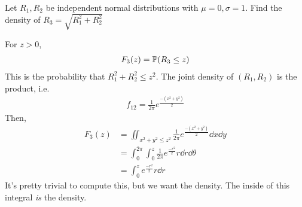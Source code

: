 \begin{example}
    Let $R_1,R_2$ be independent normal distributions with $\mu = 0, \sigma = 1$. Find the density of $R_3 = \sqrt{R_1^2 + R_2^2}$
\end{example}
\begin{solution}
    For $z > 0$,
    \begin{align}
        F_3(z) = \mathbb{P}(R_3 \le z)
    \end{align}
    This is the probability that $R_1^2 + R_2^2 \le z^2$. The joint density of $(R_1,R_2)$ is the product, i.e.
    \begin{align}
        f_{12} = \frac{1}{2\pi} e^{\frac{-(x^2+y^2)}{2}}
    \end{align}
    Then,
    \begin{align}
        F_3(z) &= \iint_{x^2+y^2 \le z^2} \frac{1}{2\pi} e^{\frac{-(x^2+y^2)}{2}} \dd{x}\dd{y}\\
        &= \int_0^{2\pi} \int_0^z \frac{1}{2\pi} e^{\frac{-r^2}{2}} r\dd{r}\dd{\theta}\\
        &= \int_0^z e^{\frac{-r^2}{2}} r\dd{r}
    \end{align}
    It's pretty trivial to compute this, but we want the density. The inside of this integral \textit{is} the density.
\end{solution}

